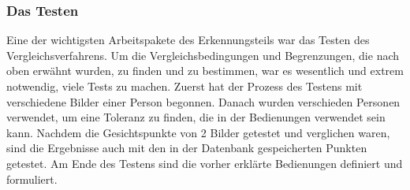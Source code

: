\subsubsection{Das Testen}
Eine der wichtigsten Arbeitspakete des Erkennungsteils war das Testen des Vergleichsverfahrens. Um die Vergleichsbedingungen und Begrenzungen, die nach oben erwähnt wurden, zu finden und zu bestimmen, war es wesentlich und extrem notwendig, viele Tests zu machen. Zuerst hat der Prozess des Testens mit verschiedene Bilder einer Person begonnen. Danach wurden verschieden Personen verwendet, um eine Toleranz zu finden, die in der Bedienungen verwendet sein kann. Nachdem die Gesichtspunkte von 2 Bilder getestet und verglichen waren, sind die Ergebnisse auch mit den in der Datenbank gespeicherten Punkten getestet. Am Ende des Testens sind die vorher erklärte Bedienungen definiert und formuliert.\\

